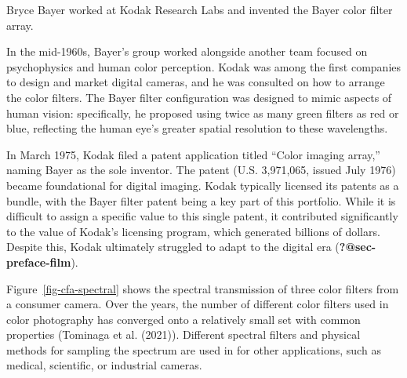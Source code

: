 \documentclass[
  letterpaper,
]{book}
\begin{document}
\begin{tcolorbox}[enhanced jigsaw, opacitybacktitle=0.6, breakable, bottomtitle=1mm, leftrule=.75mm, colframe=quarto-callout-note-color-frame, colback=white, left=2mm, opacityback=0, title=\textcolor{quarto-callout-note-color}{\faInfo}\hspace{0.5em}{Bayer pattern}, toptitle=1mm, bottomrule=.15mm, titlerule=0mm, arc=.35mm, colbacktitle=quarto-callout-note-color!10!white, toprule=.15mm, rightrule=.15mm, coltitle=black]

Bryce Bayer worked at Kodak Research Labs and invented the Bayer color
filter array.

In the mid-1960s, Bayer's group worked alongside another team focused on
psychophysics and human color perception. Kodak was among the first
companies to design and market digital cameras, and he was consulted on
how to arrange the color filters. The Bayer filter configuration was
designed to mimic aspects of human vision: specifically, he proposed
using twice as many green filters as red or blue, reflecting the human
eye's greater spatial resolution to these wavelengths.

In March 1975, Kodak filed a patent application titled ``Color imaging
array,'' naming Bayer as the sole inventor. The patent (U.S. 3,971,065,
issued July 1976) became foundational for digital imaging. Kodak
typically licensed its patents as a bundle, with the Bayer filter patent
being a key part of this portfolio. While it is difficult to assign a
specific value to this single patent, it contributed significantly to
the value of Kodak's licensing program, which generated billions of
dollars. Despite this, Kodak ultimately struggled to adapt to the
digital era (\textbf{?@sec-preface-film}).

\end{tcolorbox}

Figure~\ref{fig-cfa-spectral} shows the spectral transmission of three
color filters from a consumer camera. Over the years, the number of
different color filters used in color photography has converged onto a
relatively small set with common properties (Tominaga et al. (2021)).
Different spectral filters and physical methods for sampling the
spectrum are used in for other applications, such as medical,
scientific, or industrial cameras.
\end{document}
